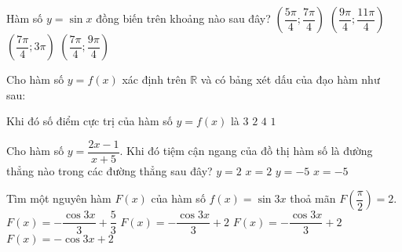 \begin{ex}%
	Hàm số $ y = \sin x  $ đồng biến trên khoảng nào sau đây?
	\choice
	{$ \left ( \dfrac{5 \pi}{4}; \dfrac{7 \pi}{4} \right ) $}
	{$ \left ( \dfrac{9 \pi}{4}; \dfrac{11 \pi}{4} \right ) $}
	{$ \left ( \dfrac{7 \pi}{4}; 3 \pi \right ) $}
	{\True $ \left ( \dfrac{7 \pi}{4}; \dfrac{9 \pi}{4} \right ) $}
\end{ex}	
\begin{ex}%
	Cho hàm số $ y = f(x) $ xác định trên $ \mathbb{R} $ và có bảng xét dấu của đạo hàm như sau:
	\begin{center}
	\end{center}
	Khi đó số điểm cực trị của hàm số $ y = f(x) $ là	
	\choice
	{\True $ 3 $}
	{$ 2 $}
	{$ 4 $}
	{$ 1 $}
\end{ex}	
\begin{ex}%
	Cho hàm số $ y = \dfrac{2x - 1}{x + 5} $. Khi đó tiệm cận ngang của đồ thị hàm số là đường thẳng nào trong các đường thẳng sau đây?
	\choice
	{\True $ y = 2 $}
	{$ x = 2 $}
	{$ y = -5 $}
	{$ x = -5 $}
\end{ex}	
\begin{ex}%
	Tìm một nguyên hàm $ F(x) $ của hàm số $ f(x) = \sin 3x $ thoả mãn $ F \left (\dfrac{\pi}{2} \right ) = 2 $.
	\choice
	{$ F(x) = - \dfrac{\cos 3x }{3} + \dfrac{5}{3} $}
	{\True $ F(x) = - \dfrac{\cos 3x }{3} + 2 $}
	{$ F(x) = - \dfrac{\cos 3x }{3} + 2 $}
	{$ F(x) = - \cos 3x  + 2 $}
\end{ex}	
